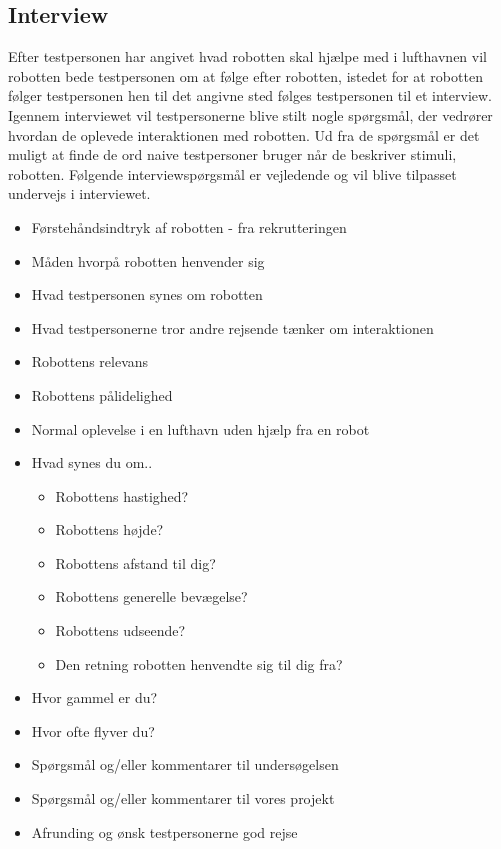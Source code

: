 \subsection*{Interview}
\label{Interview}
%
Efter testpersonen har angivet hvad robotten skal hjælpe med i lufthavnen vil robotten bede testpersonen om at følge efter robotten, istedet for at robotten følger testpersonen hen til det angivne sted følges testpersonen til et interview. Igennem interviewet vil testpersonerne blive stilt nogle spørgsmål, der vedrører hvordan de oplevede interaktionen med robotten. Ud fra de spørgsmål er det muligt at finde de ord naive testpersoner bruger når de beskriver stimuli, robotten. Følgende interviewspørgsmål er vejledende og vil blive tilpasset undervejs i interviewet.  
%
\begin{itemize}
\item Førstehåndsindtryk af robotten - fra rekrutteringen
\item Måden hvorpå robotten henvender sig
\item Hvad testpersonen synes om robotten
\item Hvad testpersonerne tror andre rejsende tænker om interaktionen 
\item Robottens relevans
\item Robottens pålidelighed
\item Normal oplevelse i en lufthavn uden hjælp fra en robot\blankline 
\end{itemize}
\noindent
%
\begin{itemize}
\item Hvad synes du om..
	\begin{itemize}
		\item Robottens hastighed?
		\item Robottens højde?
		\item Robottens afstand til dig?
		\item Robottens generelle bevægelse?
		\item Robottens udseende?
		\item Den retning robotten henvendte sig til dig fra?
	\end{itemize}
\item Hvor gammel er du?
\item Hvor ofte flyver du?
\item Spørgsmål og/eller kommentarer til undersøgelsen 
\item Spørgsmål og/eller kommentarer til vores projekt
\item Afrunding og ønsk testpersonerne god rejse
\end{itemize}
% 

